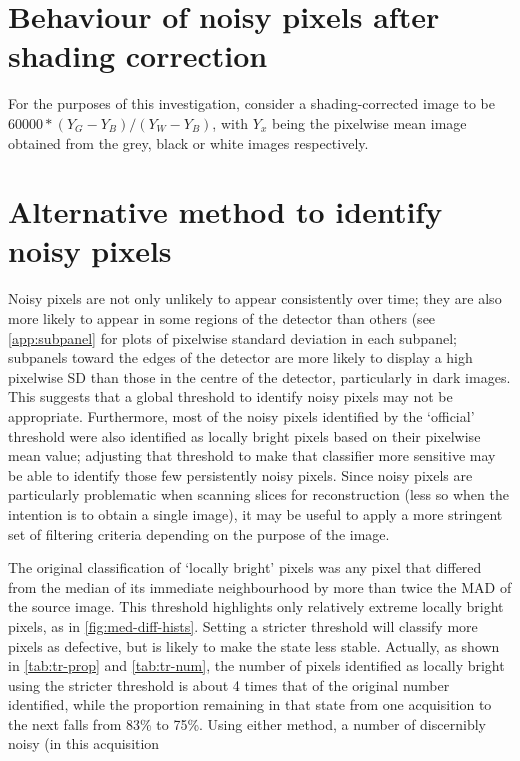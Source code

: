 \documentclass[10pt,fleqn]{article}
\begin{document}
\clearpage


\section{Behaviour of noisy pixels after shading correction}

For the purposes of this investigation, consider a shading-corrected image to be $60000 * (Y_G - Y_B) / (Y_W - Y_B)$, with $Y_x$ being the pixelwise mean image obtained from the grey, black or white images respectively.

\section{Alternative method to identify noisy pixels}


Noisy pixels are not only unlikely to appear consistently over time; they are also more likely to appear in some regions of the detector than others (see \autoref{app:subpanel} for plots of pixelwise standard deviation in each subpanel; subpanels toward the edges of the detector are more likely to display a high pixelwise SD than those in the centre of the detector, particularly in dark images. This suggests that a global threshold to identify noisy pixels may not be appropriate. Furthermore, most of the noisy pixels identified by the `official' threshold were also identified as locally bright pixels based on their pixelwise mean value; adjusting that threshold to make that classifier more sensitive may be able to identify those few persistently noisy pixels. Since noisy pixels are particularly problematic when scanning slices for reconstruction (less so when the intention is to obtain a single image), it may be useful to apply a more stringent set of filtering criteria depending on the purpose of the image.

The original classification of `locally bright' pixels was any pixel that differed from the median of its immediate neighbourhood by more than twice the MAD of the source image. This threshold highlights only relatively extreme locally bright pixels, as in \autoref{fig:med-diff-hists}. Setting a stricter threshold will classify more pixels as defective, but is likely to make the state less stable. Actually, as shown in \autoref{tab:tr-prop} and \ref{tab:tr-num}, the number of pixels identified as locally bright using the stricter threshold is about 4 times that of the original number identified, while the proportion remaining in that state from one acquisition to the next falls from 83\% to 75\%. Using either method, a number of discernibly noisy (in this acquisition
\end{document}
